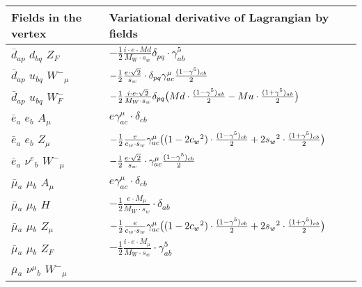 \begin{center}
\begin{tabular}{|l|l|} \hline
Fields in the vertex & Variational derivative of Lagrangian by fields \\ \hline
$\bar{d}{}_{a p }$ \phantom{-} $d{}_{b q }$ \phantom{-} $Z_F{}_{}$ \phantom{-}  &
	$-\frac{1}{2}\frac{ i \cdot e \cdot Md}{ M_W \cdot s_w}\delta_{p q} \cdot \gamma_{a b}^5 $\\[2mm]
$\bar{d}{}_{a p }$ \phantom{-} $u{}_{b q }$ \phantom{-} $W^-{}_{\mu }$ \phantom{-}  &
	$-\frac{1}{2}\frac{ e \cdot\sqrt{2}}{ s_w}\cdot \delta_{p q} \gamma_{a c}^\mu {(1-\gamma^5)_{c b}\over 2} $\\[2mm]
$\bar{d}{}_{a p }$ \phantom{-} $u{}_{b q }$ \phantom{-} $W^-_F{}_{}$ \phantom{-}  &
	$-\frac{1}{2}\frac{ i \cdot e \cdot\sqrt{2}}{ M_W \cdot s_w}\delta_{p q} \big( Md\cdot {(1-\gamma^5)_{a b}\over 2} - Mu\cdot {(1+\gamma^5)_{a b}\over 2} \big)$\\[2mm]
$\bar{e}{}_{a }$ \phantom{-} $e{}_{b }$ \phantom{-} ${A}_{\mu }$ \phantom{-}  &
	$ e\gamma_{a c}^\mu \cdot \delta_{c b} $\\[2mm]
$\bar{e}{}_{a }$ \phantom{-} $e{}_{b }$ \phantom{-} ${Z}_{\mu }$ \phantom{-}  &
	$-\frac{1}{2}\frac{ e}{ c_w \cdot s_w}\gamma_{a c}^\mu \big( (1-2 c_w {}^2)\cdot {(1-\gamma^5)_{c b}\over 2} +2 s_w{}^2 \cdot {(1+\gamma^5)_{c b}\over 2} \big)$\\[2mm]
$\bar{e}{}_{a }$ \phantom{-} $\nu^e{}_{b }$ \phantom{-} $W^-{}_{\mu }$ \phantom{-}  &
	$-\frac{1}{2}\frac{ e \cdot\sqrt{2}}{ s_w}\cdot \gamma_{a c}^\mu {(1-\gamma^5)_{c b}\over 2} $\\[2mm]
$\bar{\mu}{}_{a }$ \phantom{-} $\mu{}_{b }$ \phantom{-} ${A}_{\mu }$ \phantom{-}  &
	$ e\gamma_{a c}^\mu \cdot \delta_{c b} $\\[2mm]
$\bar{\mu}{}_{a }$ \phantom{-} $\mu{}_{b }$ \phantom{-} ${H}_{}$ \phantom{-}  &
	$-\frac{1}{2}\frac{ e \cdot M_{\mu}}{ M_W \cdot s_w}\cdot \delta_{a b} $\\[2mm]
$\bar{\mu}{}_{a }$ \phantom{-} $\mu{}_{b }$ \phantom{-} ${Z}_{\mu }$ \phantom{-}  &
	$-\frac{1}{2}\frac{ e}{ c_w \cdot s_w}\gamma_{a c}^\mu \big( (1-2 c_w {}^2)\cdot {(1-\gamma^5)_{c b}\over 2} +2 s_w{}^2 \cdot {(1+\gamma^5)_{c b}\over 2} \big)$\\[2mm]
$\bar{\mu}{}_{a }$ \phantom{-} $\mu{}_{b }$ \phantom{-} $Z_F{}_{}$ \phantom{-}  &
	$-\frac{1}{2}\frac{ i \cdot e \cdot M_{\mu}}{ M_W \cdot s_w}\cdot \gamma_{a b}^5 $\\[2mm]
$\bar{\mu}{}_{a }$ \phantom{-} $\nu^\mu{}_{b }$ \phantom{-} $W^-{}_{\mu }$ \phantom{-}  &

\end{tabular}
\end{center}
